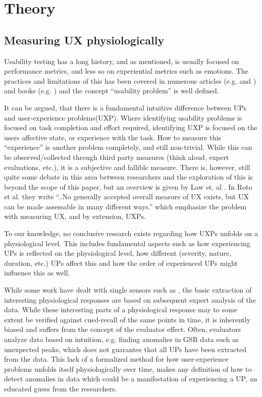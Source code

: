 \section{Theory}
\subsection{Measuring UX physiologically}
Usability testing has a long history, and as mentioned, is usually focused on performance metrics, and less so
on experiential metrics such as emotions.  The practices and limitations of this has been covered in numerous articles
(e.g. \cite{usability_eval} and \cite{eval_effect}) and books (e.g. \cite{guide_to_upeval}) and the concept ``usability
problem'' is well defined.

It can be argued, that there is a fundamental intuitive difference between UPs and user-experience problems(UXP).  Where
identifying usability problems is focused on task completion and effort required, identifying UXP is focused on the
users affective state, or experience with the task.  How to measure this ``experience'' is another problem completely,
and still non-trivial. While this can be observed/collected through third party measures
(think aloud, expert evaluations, etc.), it is a subjective and fallible measure.  There is, however,
still quite some debate in this area between researchers and the exploration of this is beyond the scope of this paper,
but an overview is given by Law et. al \cite{attitudes_ux_measure}.  In Roto et al. \cite{what_is_ux} they write ``..No
generally accepted overall measure of UX exists, but UX can be made assessable in many different ways.'' which 
emphasize the problem with measuring UX, and by extension, UXPs.

To our knowledge, no conclusive research exists regarding how UXPs unfolds on a physiological level. This includes
fundamental aspects such as how experiencing UPs is reflected on the physiological level, how different (severity, nature,
duration, etc.) UPs affect this and how the order of experienced UPs might influence this as well.

While some work have dealt with single sensors such as \cite{mind_the_gap} \cite{LH-paper}, the basic extraction of
interesting physiological responses are based on subsequent expert analysis of the data.  While these interesting parts
of a physiological response may to some extent be verified against cued-recall of the same points in time, it is
inherently biased and suffers from the concept of the evaluator effect. Often, evaluators analyze data based on
intuition, e.g. finding anomalies in GSR data such as unexpected peaks, which does not guarantee that all UPs have been
extracted from the data.  This lack of a formalized method for how user-experience problems unfolds itself
physiologically over time, makes any definition of how to detect anomalies in data which could be a manifestation of
experiencing a UP, an educated guess from the researchers.

